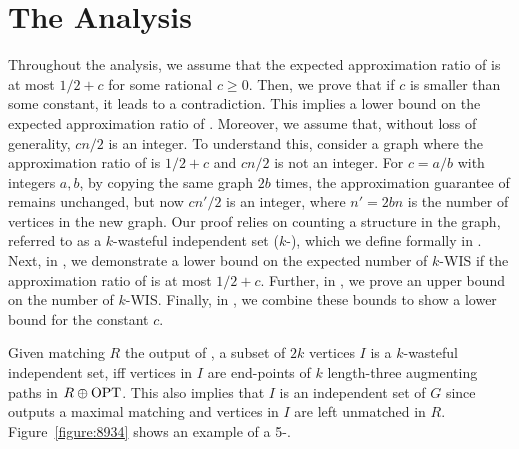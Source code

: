 
\section{The Analysis}

Throughout the analysis, we assume that the expected approximation ratio of \rnk{} is at most $1/2 + c$ for some rational $c \geq 0$. Then, we prove that if $c$ is smaller than some constant, it leads to a contradiction. This implies a lower bound on the expected approximation ratio of \rnk{}. Moreover, we assume that, without loss of generality, $cn/2$ is an integer. To understand this, consider a graph where the approximation ratio of \rnk{} is $1/2 + c$ and $cn/2$ is not an integer. For $c=a/b$ with integers $a,b$, by copying the same graph $2b$ times, the approximation guarantee of \rnk{} remains unchanged, but now $cn'/2$ is an integer, where $n'=2bn$ is the number of vertices in the new graph. Our proof relies on counting a structure in the graph, referred to as a $k$-wasteful independent set ($k$-\wis), which we define formally in . 
Next, in , we demonstrate a lower bound on the expected number of $k$-WIS if the approximation ratio of \rnk{} is at most $1/2 + c$. Further, in , we prove an upper bound on the number of $k$-WIS. Finally, in , we combine these bounds to show a lower bound for the constant $c$.


\begin{definition}\label{def:ltap}
Given matching $R$ the output of \rnk{}, a subset of $2k$ vertices $I$ is a $k$-wasteful independent set, iff vertices in $I$ are end-points of $k$ length-three augmenting paths in $R\oplus \text{OPT}{}$. This also implies that $I$ is an independent set of $G$ since \rnk{} outputs a maximal matching and vertices in $I$ are left unmatched in $R$. Figure~\ref{figure:8934} shows an example of a 5-\wis{}.
\end{definition}




